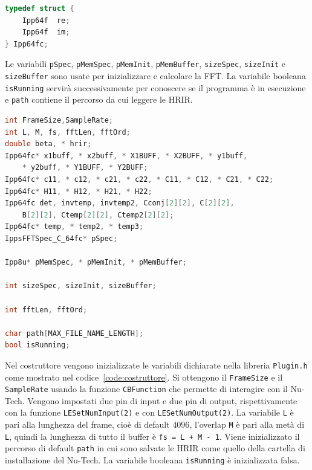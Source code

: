 \documentclass[12pt,a4paper,titlepage]{article}
\begin{document}
\begin{lstlisting}[language=cpp, label=code:Ipp64fc, caption = Struct \texttt{Ipp64fc}, captionpos = b]
typedef struct {
    Ipp64f  re;
    Ipp64f  im;
} Ipp64fc;
\end{lstlisting}

Le variabili \texttt{pSpec}, \texttt{pMemSpec}, \texttt{pMemInit}, \texttt{pMemBuffer}, \texttt{sizeSpec}, \texttt{sizeInit} e \texttt{sizeBuffer} sono usate per inizializzare e calcolare la FFT. La variabile booleana \texttt{isRunning} servirà successivamente per conoscere se il programma è in esecuzione e \texttt{path} contiene il percorso da cui leggere le HRIR.

\begin{lstlisting}[language=cpp, label=code:variabili, caption = Dichiarazione delle variabili in \texttt{Plugin.h}, breaklines = false, captionpos = b]
int FrameSize,SampleRate;
int L, M, fs, fftLen, fftOrd;
double beta, * hrir;
Ipp64fc* x1buff, * x2buff, * X1BUFF, * X2BUFF, * y1buff, 
	* y2buff, * Y1BUFF, * Y2BUFF;
Ipp64fc* c11, * c12, * c21, * c22, * C11, * C12, * C21, * C22;
Ipp64fc* H11, * H12, * H21, * H22;
Ipp64fc det, invtemp, invtemp2, Cconj[2][2], C[2][2], 
	B[2][2], Ctemp[2][2], Ctemp2[2][2];
Ipp64fc* temp, * temp2, * temp3;
IppsFFTSpec_C_64fc* pSpec;

Ipp8u* pMemSpec, * pMemInit, * pMemBuffer;

int sizeSpec, sizeInit, sizeBuffer;

int fftLen, fftOrd;

char path[MAX_FILE_NAME_LENGTH];
bool isRunning;
\end{lstlisting}
Nel costruttore vengono inizializzate le variabili dichiarate nella libreria \texttt{Plugin.h} come mostrato nel codice~\ref{code:costruttore}. Si ottengono il \texttt{FrameSize} e il \texttt{SampleRate} usando la funzione \texttt{CBFunction} che permette di interagire con il Nu-Tech. Vengono impostati due pin di input e due pin di output, rispettivamente con la funzione \texttt{LESetNumInput(2)} e con \texttt{LESetNumOutput(2)}. La variabile \texttt{L} è pari alla lunghezza del frame, cioè di default $4096$, l'overlap \texttt{M} è pari alla metà di \texttt{L}, quindi la lunghezza di tutto il buffer è \texttt{fs = L + M - 1}. Viene inizializzato il percorso di default \texttt{path} in cui sono salvate le HRIR come quello della cartella di installazione del Nu-Tech. La variabile booleana \texttt{isRunning} è inizializzata falsa.
\end{document}
